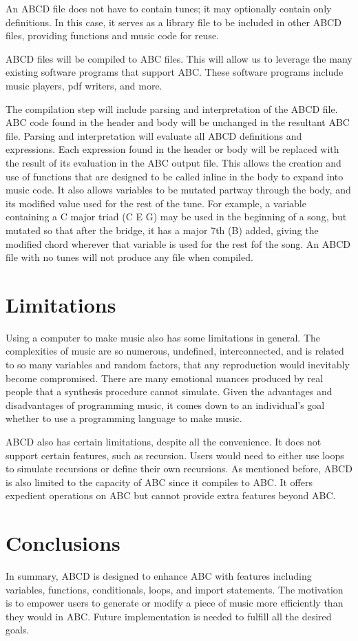 An ABCD file does not have to contain tunes; it may optionally contain only definitions. In this case, it serves as a library file to be included in other ABCD files, providing functions and music code for reuse.
    
ABCD files will be compiled to ABC files. This will allow us to leverage the many existing software programs that support ABC\cite{Walshaw17}. These software programs include music players, pdf writers, and more.

The compilation step will include parsing and interpretation of the ABCD file. ABC code found in the header and body will be unchanged in the resultant ABC file. Parsing and interpretation will evaluate all ABCD definitions and expressions. Each expression found in the header or body will be replaced with the result of its evaluation in the ABC output file. This allows the creation and use of functions that are designed to be called inline in the body to expand into music code. It also allows variables to be mutated partway through the body, and its modified value used for the rest of the tune. For example, a variable containing a C major triad (C E G) may be used in the beginning of a song, but mutated so that after the bridge, it has a major 7th (B) added, giving the modified chord wherever that variable is used for the rest fof the song. An ABCD file with no tunes will not produce any file when compiled.

\section{Limitations}
Using a computer to make music also has some limitations in general. The complexities of music are so numerous, undefined, interconnected, and is related to so many variables and random factors, that any reproduction would inevitably become compromised. There are many emotional nuances produced by real people that a synthesis procedure cannot simulate\cite{Dobrian88}.  Given the advantages and disadvantages of programming music, it comes down to an individual's goal whether to use a programming language to make music. 

ABCD also has certain limitations, despite all the convenience. It does not support certain features, such as recursion. Users would need to either use loops to simulate recursions or define their own recursions. As mentioned before, ABCD is also limited to the capacity of ABC since it compiles to ABC. It offers expedient operations on ABC but cannot provide extra features beyond ABC.

\section{Conclusions}
In summary, ABCD is designed to enhance ABC with features including variables, functions, conditionals, loops, and import statements. The motivation is to empower users to generate or modify a piece of music more efficiently than they would in ABC.  Future implementation is needed to fulfill all the desired goals.
